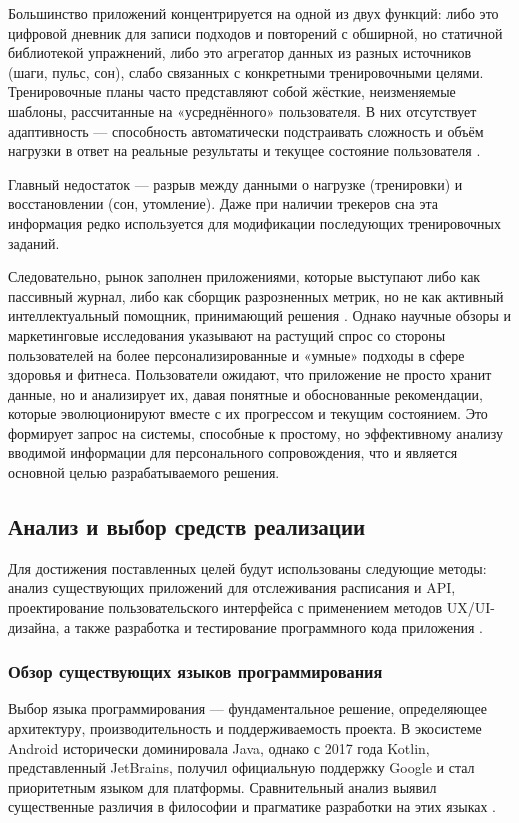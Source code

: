 Большинство приложений концентрируется на одной из двух функций: либо это цифровой дневник для записи подходов и повторений с обширной, но статичной библиотекой упражнений, либо это агрегатор данных из разных источников (шаги, пульс, сон), слабо связанных с конкретными тренировочными целями. Тренировочные планы часто представляют собой жёсткие, неизменяемые шаблоны, рассчитанные на «усреднённого» пользователя. В них отсутствует адаптивность — способность автоматически подстраивать сложность и объём нагрузки в ответ на реальные результаты и текущее состояние пользователя \cite{refl}.

Главный недостаток — разрыв между данными о нагрузке (тренировки) и восстановлении (сон, утомление). Даже при наличии трекеров сна эта информация редко используется для модификации последующих тренировочных заданий.

Следовательно, рынок заполнен приложениями, которые выступают либо как пассивный журнал, либо как сборщик разрозненных метрик, но не как активный интеллектуальный помощник, принимающий решения \cite{refl}. Однако научные обзоры и маркетинговые исследования указывают на растущий спрос со стороны пользователей на более персонализированные и «умные» подходы в сфере здоровья и фитнеса. Пользователи ожидают, что приложение не просто хранит данные, но и анализирует их, давая понятные и обоснованные рекомендации, которые эволюционируют вместе с их прогрессом и текущим состоянием. Это формирует запрос на системы, способные к простому, но эффективному анализу вводимой информации для персонального сопровождения, что и является основной целью разрабатываемого решения.

\subsection{Анализ и выбор средств реализации}

Для достижения поставленных целей будут использованы следующие методы: анализ существующих приложений для отслеживания расписания и API, проектирование пользовательского интерфейса с применением методов UX/UI-дизайна, а также разработка и тестирование программного кода приложения \cite{refa,refb}.

\subsubsection{Обзор существующих языков программирования}

Выбор языка программирования — фундаментальное решение, определяющее архитектуру, производительность и поддерживаемость проекта. В экосистеме Android исторически доминировала Java, однако с 2017 года Kotlin, представленный JetBrains, получил официальную поддержку Google и стал приоритетным языком для платформы. Сравнительный анализ выявил существенные различия в философии и прагматике разработки на этих языках \cite{refb}.

